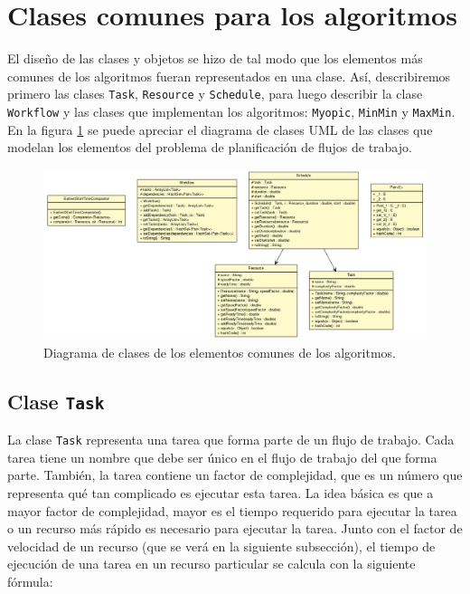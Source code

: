 \section{Clases comunes para los algoritmos}
El diseño de las clases y objetos se hizo de tal modo que los elementos más comunes de los algoritmos fueran representados en una clase. Así, describiremos primero las clases \texttt{Task}, \texttt{Resource} y \texttt{Schedule}, para luego describir la clase \texttt{Workflow} y las clases que implementan los algoritmos: \texttt{Myopic}, \texttt{MinMin} y \texttt{MaxMin}. En la figura \ref{fig:uml_class} se puede apreciar el diagrama de clases UML de las clases que modelan los elementos del problema de planificación de flujos de trabajo.

\begin{figure}
\label{fig:uml_class}
\begin{center}
\includegraphics[width=1.0\textwidth]{imagenes/uml_class}
\end{center}
\caption{Diagrama de clases de los elementos comunes de los algoritmos.}
\end{figure}

\subsection{Clase \texttt{Task}}
La clase \texttt{Task} representa una tarea que forma parte de un flujo de trabajo. Cada tarea tiene un nombre que debe ser único en el flujo de trabajo del que forma parte. También, la tarea contiene un factor de complejidad, que es un número que representa qué tan complicado es ejecutar esta tarea. La idea básica es que a mayor factor de complejidad, mayor es el tiempo requerido para ejecutar la tarea o un recurso más rápido es necesario para ejecutar la tarea. Junto con el factor de velocidad de un recurso (que se verá en la siguiente subsección), el tiempo de ejecución de una tarea en un recurso particular se calcula con la siguiente fórmula:


